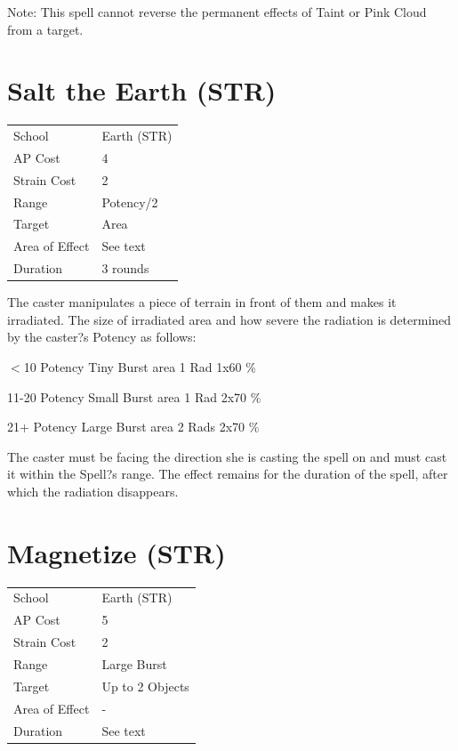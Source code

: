 \documentclass[11pt,a4paper,twocolumn]{book}
\begin{document}
	Note: This spell cannot reverse the permanent effects of Taint or Pink Cloud from a target.
	
			\section*{Salt the Earth (STR)}
	{
		\begin{tabu} to 75mm{| X[l,4] | X[l,7] |}
			\hline
			School 			&  Earth (STR)			\\
			AP Cost	      	&  4					\\
			Strain Cost     &  2					\\
			Range     		&  Potency/2			\\
			Target      	&  Area					\\
			Area of Effect  &  See text	 			\\
			Duration     	&  3 rounds				\\ \hline
		\end{tabu}
		
	}
	
	\medskip
	
	The caster manipulates a piece of terrain in front of them and makes it irradiated. The size of irradiated area and how severe the radiation is determined by the caster?s Potency as follows:

	\begin{compactitem}
		\item $<$10 Potency 		Tiny Burst area 1 Rad 1x60 \%
		\item 11-20 Potency 		Small Burst area 1 Rad 2x70 \%
		\item 21+ Potency 			Large Burst area 2 Rads 2x70 \%
	\end{compactitem}

	The caster must be facing the direction she is casting the spell on and must cast it within the Spell?s range. The effect remains for the duration of the spell, after which the radiation disappears.
	
	\section*{Magnetize (STR)}
	{
		\begin{tabu} to 75mm{| X[l,4] | X[l,7] |}
			\hline
			School 			&  Earth (STR)			\\
			AP Cost	      	&  5					\\
			Strain Cost     &  2					\\
			Range     		&  Large Burst			\\
			Target      	&  Up to 2 Objects		\\
			Area of Effect  &  -	 				\\
			Duration     	&  See text				\\ \hline
		\end{tabu}
		
	}
	
\end{document}

